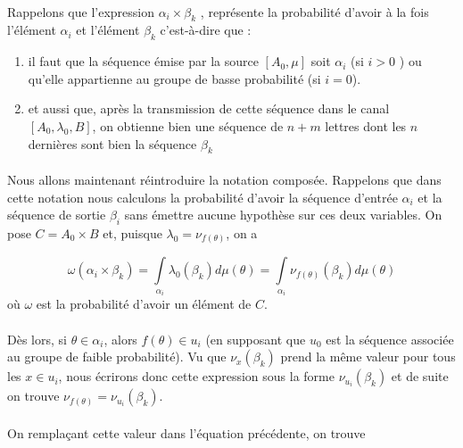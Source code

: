 	\paragraph{}
	Rappelons que l'expression $\alpha_i \times \beta_k$ , représente 
	la probabilité d'avoir à la fois l'élément $\alpha_i$ et 
	l'élément $\beta_k$ c'est-à-dire que :
	\begin{enumerate}
		\item il faut que la séquence émise par la source $[A_0,\mu]$ soit 
			$\alpha_i$ (si $i >0$ ) ou qu'elle appartienne au groupe de 
			basse probabilité (si $i=0$).
		\item et aussi que, après la transmission de cette séquence dans 
			le canal $[A_0,\lambda_0,B]$, on obtienne bien une séquence 
			de $n+m$ lettres dont les $n$ 
			dernières sont bien la séquence $\beta_k$
	\end{enumerate} 
	
	\paragraph{}
	Nous allons maintenant réintroduire la notation composée. Rappelons que
	dans cette notation nous calculons la probabilité d'avoir la séquence
	d'entrée $\alpha_i$ et la séquence de sortie $\beta_i$ sans émettre aucune
	hypothèse sur ces deux variables. On pose $C = A_0 \times B$ et,
	puisque $\lambda_0 = \nu_{f(\theta)}$, on a
	
	
	\[
		\omega(\alpha_i\times\beta_k)=
		\int\limits_{\alpha_i}\lambda_0(\beta_k)d\mu(\theta)=
		\int\limits_{\alpha_i}\nu_{f(\theta)}(\beta_k)d\mu(\theta)
	\]
	où $\omega$ est la probabilité d'avoir un élément de $C$.
	
	\paragraph{}
	Dès lors, si $\theta \in \alpha_i$, alors $f(\theta) \in u_i$ (en supposant
	que $u_0$ est la séquence associée au groupe de faible probabilité).
	Vu que $\nu_x(\beta_k)$ prend la même valeur pour tous les $x \in u_i$,
	nous écrirons donc cette expression sous la forme $\nu_{u_i}(\beta_k)$ et
	de suite on trouve $\nu_{f(\theta)}=\nu_{u_i}(\beta_k)$.
	
	\paragraph{}
	On remplaçant cette valeur dans l'équation précédente, on trouve
	
